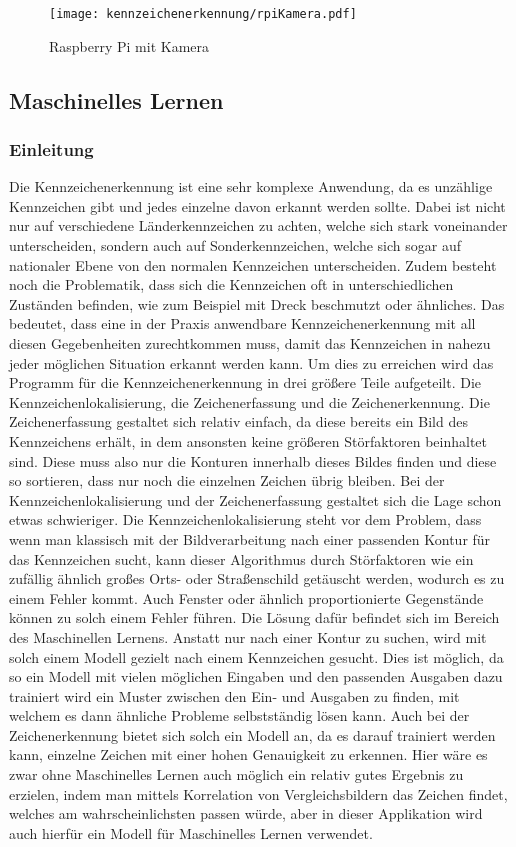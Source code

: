 \begin{figure}[H]
    \centering
    \texttt{[image: kennzeichenerkennung/rpiKamera.pdf]}
    \caption{Raspberry Pi mit Kamera}
\end{figure}

\subsection{Maschinelles Lernen}

\subsubsection{Einleitung}
Die Kennzeichenerkennung ist eine sehr komplexe Anwendung, da es unzählige Kennzeichen gibt und jedes einzelne davon erkannt werden sollte. 
Dabei ist nicht nur auf verschiedene Länderkennzeichen zu achten, welche sich stark voneinander unterscheiden, sondern auch auf Sonderkennzeichen, 
welche sich sogar auf nationaler Ebene von den normalen Kennzeichen unterscheiden. Zudem besteht noch die Problematik, dass sich die Kennzeichen 
oft in unterschiedlichen Zuständen befinden, wie zum Beispiel mit Dreck beschmutzt oder ähnliches. Das bedeutet, dass eine in der Praxis 
anwendbare Kennzeichenerkennung mit all diesen Gegebenheiten zurechtkommen muss, damit das Kennzeichen in nahezu jeder möglichen Situation 
erkannt werden kann. Um dies zu erreichen wird das Programm für die Kennzeichenerkennung in drei größere Teile aufgeteilt. Die Kennzeichenlokalisierung, 
die Zeichenerfassung und die Zeichenerkennung. Die Zeichenerfassung gestaltet sich relativ einfach, da diese bereits ein Bild des Kennzeichens erhält, 
in dem ansonsten keine größeren Störfaktoren beinhaltet sind. Diese muss also nur die Konturen innerhalb dieses Bildes finden und diese so sortieren, 
dass nur noch die einzelnen Zeichen übrig bleiben. Bei der Kennzeichenlokalisierung und der Zeichenerfassung gestaltet sich die Lage schon etwas schwieriger. 
Die Kennzeichenlokalisierung steht vor dem Problem, dass wenn man klassisch mit der Bildverarbeitung nach einer passenden Kontur für das Kennzeichen sucht, 
kann dieser Algorithmus durch Störfaktoren wie ein zufällig ähnlich großes Orts- oder Straßenschild getäuscht werden, wodurch es zu einem Fehler kommt. 
Auch Fenster oder ähnlich proportionierte Gegenstände können zu solch einem Fehler führen. Die Lösung dafür befindet sich im Bereich des Maschinellen Lernens. 
Anstatt nur nach einer Kontur zu suchen, wird mit solch einem Modell gezielt nach einem Kennzeichen gesucht. Dies ist möglich, da so ein Modell mit vielen 
möglichen Eingaben und den passenden Ausgaben dazu trainiert wird ein Muster zwischen den Ein- und Ausgaben zu finden, mit welchem es dann ähnliche Probleme 
selbstständig lösen kann. Auch bei der Zeichenerkennung bietet sich solch ein Modell an, da es darauf trainiert werden kann, einzelne Zeichen mit einer 
hohen Genauigkeit zu erkennen. Hier wäre es zwar ohne Maschinelles Lernen auch möglich ein relativ gutes Ergebnis zu erzielen, indem man mittels Korrelation 
von Vergleichsbildern das Zeichen findet, welches am wahrscheinlichsten passen würde, aber in dieser Applikation wird auch hierfür ein Modell für Maschinelles Lernen verwendet.

